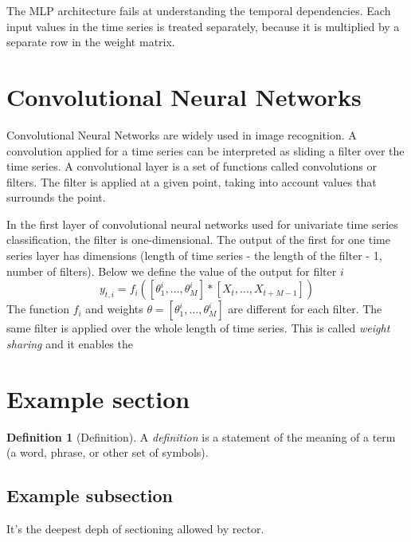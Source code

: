 \documentclass[a4paper,11pt,twoside]{report}
\theoremstyle{definition}
\newtheorem{definition}[theorem]{Definition}
\begin{document}
The MLP architecture fails at understanding the temporal dependencies. Each input values in the time series is treated separately, because it is multiplied by a separate row in the weight matrix. 

\section{Convolutional Neural Networks}
Convolutional Neural Networks are widely used in image recognition. A convolution applied for a time series can be interpreted as sliding a filter over the time series. A convolutional layer is a set of functions called convolutions or filters. The filter is applied at a given point, taking into account values that surrounds the point. 

In the first layer of convolutional neural networks used for univariate time series classification, the filter is one-dimensional. The output of the first for one time series layer has dimensions (length of time series - the length of the filter - 1, number of filters). Below we define the value of the output for filter $i$  
$$ y_{t, i} = f_i([\theta_1^i, \dots , \theta_M^i] * [X_{t}, \dots, X_{t+M-1}])$$ 
The function $f_i$ and weights $\theta = [\theta_1^i, \dots , \theta_M^i]$ are different for each filter.
The same filter is applied over the whole length of time series. This is called \textit{weight sharing} and it enables the 

\section{Example section}

\begin{definition}[Definition]
	A \emph{definition} is a statement of the meaning of a term (a word, phrase, or other set of symbols).
\end{definition}

\subsection{Example subsection}

It's the deepest deph of sectioning allowed by rector.
\end{document}
